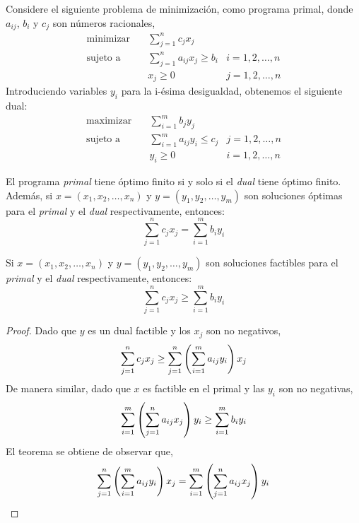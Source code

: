 \documentclass[../np-approximations.tex]{subfiles}
\begin{document}
Considere el siguiente problema de minimización, como programa primal, donde $a_{ij}$, $b_i$ y $c_j$ son números racionales,
\begin{align*}
	\text{minimizar}\quad & \sum_{j=1}^n c_jx_j            \\
	\text{sujeto a}\quad  & \sum_{j=1}^n a_{ij}x_j \ge b_i 
	& i=1,2,\dots,n \\
	  & x_j \ge 0 & j=1,2,\dots,n 
\end{align*}
Introduciendo variables $y_i$ para la i-ésima desigualdad, obtenemos el siguiente dual:
\begin{align*}
	\text{maximizar}\quad & \sum_{i=1}^m b_jy_j            \\
	\text{sujeto a}\quad  & \sum_{i=1}^m a_{ij}y_i \le c_j 
	& j=1,2,\dots,n \\
	  & y_i \ge 0 & i=1,2,\dots,n 
\end{align*}

\begin{theorem}[LP-Duality]
	El programa \emph{primal} tiene óptimo finito si y solo si el \emph{dual} tiene óptimo finito. Además, si
	$x=(x_1,x_2,\dots,x_n)$ y $y=(y_1,y_2,\dots,y_m)$ son soluciones óptimas para el \emph{primal} y el \emph{dual} respectivamente, entonces:
	$$\sum_{j=1}^n c_jx_j = \sum_{i=1}^m b_iy_i$$
\end{theorem}

\begin{theorem}
	Si $x=(x_1,x_2,\dots,x_n)$ y $y=(y_1,y_2,\dots,y_m)$ son soluciones factibles para el \emph{primal} y el \emph{dual} respectivamente, entonces:
	\begin{equation}
		\label{eq:weak-lp-duality}
		\sum_{j=1}^n c_jx_j \ge \sum_{i=1}^m b_i y_i
	\end{equation}
\end{theorem}

\begin{proof}
	Dado que $y$ es un dual factible y los $x_j$ son no negativos,
	\begin{equation}
		\label{eq:weak-lp-duality:1}
		\sum_{j=1}^n c_j x_j \ge \sum_{j=1}^n\left( \sum_{i=1}^m a_{ij}y_i \right) x_j
	\end{equation}
	De manera similar, dado que $x$ es factible en el primal y las $y_i$ son no negativas,
	\begin{equation}
		\label{eq:weak-lp-duality:2}
		\sum_{i=1}^m\left( \sum_{j=1}^n a_{ij}x_j \right) y_i \ge \sum_{i=1}^m b_i y_i
	\end{equation}
	El teorema se obtiene de observar que,
	\begin{equation*}
		\sum_{j=1}^n\left( \sum_{i=1}^m a_{ij}y_i \right) x_j =
		\sum_{i=1}^m\left( \sum_{j=1}^n a_{ij}x_j \right) y_i
	\end{equation*}
																			
\end{proof}
\end{document}
